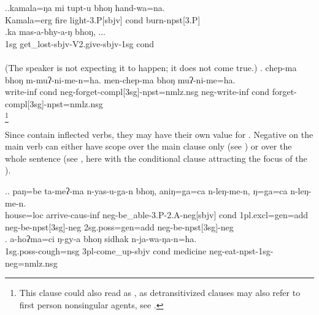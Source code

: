	
	\ex.\ag.kamala=ŋa mi tupt-u bhoŋ hand-wa=na.\\
	Kamala{\sc =erg} fire   light{\sc -3.P[sbjv]} {\sc cond} burn{\sc -npst[3.P]}\\
		\bg.\label{cond-sbjv}ka  mas-a-bhy-a-ŋ bhoŋ, ...\\
{\sc 1sg} get\_lost{\sc -sbjv-V2.give-sbjv-1sg} {\sc cond}\\
 \\
(The speaker is not expecting it to happen; it does not come true.)
\bg. chep-ma bhoŋ m-muʔ-ni-me-n=ha. men-chep-ma bhoŋ muʔ-ni-me=ha.\\
write{\sc -inf} {\sc cond} {\sc neg-}forget{\sc -compl[3sg]-npst=nmlz.nsg} {\sc neg-}write{\sc -inf} {\sc cond} forget{\sc -compl[3sg]-npst=nmlz.nsg}\\
\footnote{This clause could also read as , as detransitivized clauses may also refer to first person nonsingular agents, see .}


Since  contain inflected verbs, they may have their own value for  \Next[a]. Negative   on the main verb can either have  scope over the main clause only (see \Next[a]) or over the whole sentence (see \Next[b], here with the conditional clause attracting the focus of the ).

\ex.\ag.	paŋ=be ta-meʔ-ma n-yas-u-ga-n bhoŋ, aniŋ=ga=ca n-leŋ-me-n, ŋ=ga=ca n-leŋ-me-n.\\
			house={\sc loc} arrive{\sc -caus-inf} {\sc neg-}be\_able{\sc -3.P-2.A-neg[sbjv]} {\sc cond}  {\sc 1pl.excl=gen=add} 
			{\sc neg-}be{\sc -npst[3sg]-neg} {\sc 2sg.poss=gen=add}  {\sc neg-}be{\sc -npst[3sg]-neg}\\
			 
	\bg.	a-hoʔma=ci ŋ-gy-a bhoŋ sidhak n-ja-wa-ŋa-n=ha.\\ %
			{\sc 1sg.poss-}cough={\sc nsg}  {\sc 3pl-}come\_up{\sc -sbjv} {\sc cond} medicine {\sc neg-}eat{\sc -npst-1sg-neg=nmlz.nsg}\\ %


